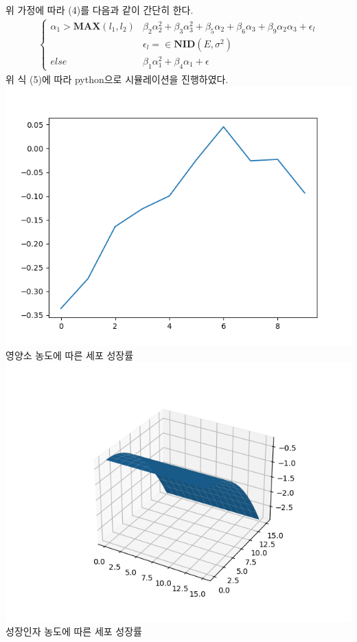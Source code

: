 \documentclass{article}
\begin{document}
    위 가정에 따라 (4)를 다음과 같이 간단히 한다.
    \begin{align}
        \left\{\begin{matrix}
            \alpha_1>\mathbf{MAX}(l_1,l_2) & \beta_2\alpha_2^2+\beta_3\alpha_3^2+\beta_5\alpha_2+\beta_6\alpha_3+\beta_9\alpha_2\alpha_3+\epsilon_l \\ & \epsilon_l = \in \mathbf{NID}(E,\sigma^2)\\
            else & \beta_1\alpha_1^2+\beta_4\alpha_1+\epsilon
        \end{matrix}\right.
    \end{align}
    위 식 (5)에 따라 python으로 시뮬레이션을 진행하였다. \\
    \includegraphics{Figure1.png} \\ 영양소 농도에 따른 세포 성장률 \\
    \includegraphics{Figure2.png} \\ 성장인자 농도에 따른 세포 성장률
\end{document}

